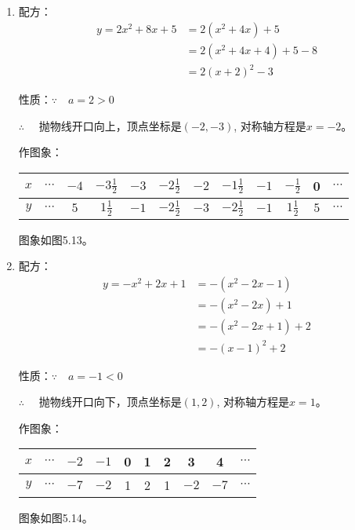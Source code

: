 \begin{solution}
\begin{enumerate}
    \item 配方：
\[\begin{split}
    y=2x^2+8x+5&=2(x^2+4x)+5\\
    &=2(x^2+4x+4)+5-8\\
    &=2(x+2)^2-3
\end{split}\]

性质：$\because\quad a=2>0$

$\therefore\quad $
抛物线开口向上，顶点坐标是$(-2,-3)$, 对称轴方程是$x=-2$。

作图象：
\begin{center}
\begin{tabular}{c|ccccccccccc}
\hline
$x$&$\cdots$& $-4$ &  $-3\tfrac{1}{2}$ & $-3$ &  $-2\tfrac{1}{2}$ & $-2$ &  $-1\tfrac{1}{2}$ &  $-1$ &  $-\tfrac{1}{2}$ &  0 &$\cdots$\\
\hline
$y$&$\cdots$ & $5$& $1\tfrac{1}{2}$ &  $-1$ &  $-2\tfrac{1}{2}$ &  $-3$ &  $-2\tfrac{1}{2}$ &  $-1$ &  $1\tfrac{1}{2}$ &  $5$ &  $\cdots$ \\
\hline
\end{tabular}
\end{center}  
图象如图5.13。

\item 配方：
\[\begin{split}
    y=-x^2+2x+1&=-(x^2-2x-1)\\
    &=-(x^2-2x)+1\\
    &=-(x^2-2x+1)+2\\
&=-(x-1)^2+2
\end{split}\]

性质：$\because\quad a=-1<0$

$\therefore\quad $
抛物线开口向下，顶点坐标是$(1,2)$, 对称轴方程是$x=1$。

作图象：
\begin{center}
\begin{tabular}{c|ccccccccc}
\hline
$x$&$\cdots$& $-2$ &  $-1$ & 0 & 1 & 2 &  3 &  4 &$\cdots$\\
\hline
$y$&$\cdots$ & $-7$& $-2$ &  1 & 2 & 1 &  $-2$ &  $-7$  &  $\cdots$ \\
\hline
\end{tabular}
\end{center}  
图象如图5.14。


\end{enumerate}
\end{solution}
